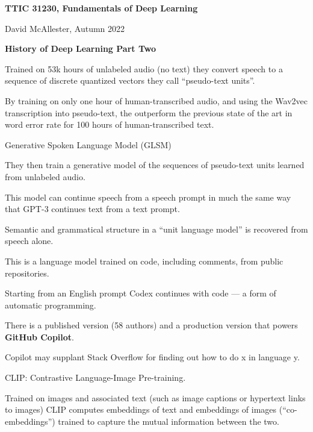 




{\Huge
  \centerline{\bf TTIC 31230,  Fundamentals of Deep Learning}
  \vfill
  \centerline{David McAllester, Autumn 2022}
  \vfill
  \centerline{\bf History of Deep Learning Part Two}

\vfill
\vfill


\vfill
Trained on 53k hours of unlabeled audio (no text) they convert speech to a sequence of discrete quantized vectors they call ``pseudo-text units''.

\vfill
By training on only one hour of human-transcribed audio, and using the Wav2vec transcription into pseudo-text, the outperform the previous state of the
art in word error rate for 100 hours of human-transcribed text.



Generative Spoken Language Model (GLSM)

\vfill
They then train a generative model of the sequences of pseudo-text units learned from unlabeled audio.


\vfill
This model can continue speech from a speech prompt in much the same way that GPT-3 continues text from a text prompt.

\vfill
Semantic and grammatical structure in a ``unit language model'' is recovered
from speech alone.


This is a language model trained on code, including comments, from public repositories.

\vfill
Starting from an English prompt Codex continues with code --- a form of automatic programming.

\vfill
There is a published version (58 authors) and a production version that powers {\bf GitHub Copilot}.

\vfill
Copilot may supplant Stack Overflow for finding out how to do x in language y.


CLIP: Contrastive Language-Image Pre-training.

\vfill
Trained on images and associated text (such as image captions or hypertext links to images) CLIP computes embeddings of text and embeddings of images
(``co-embeddings'') trained to capture the mutual information between the two.

}
